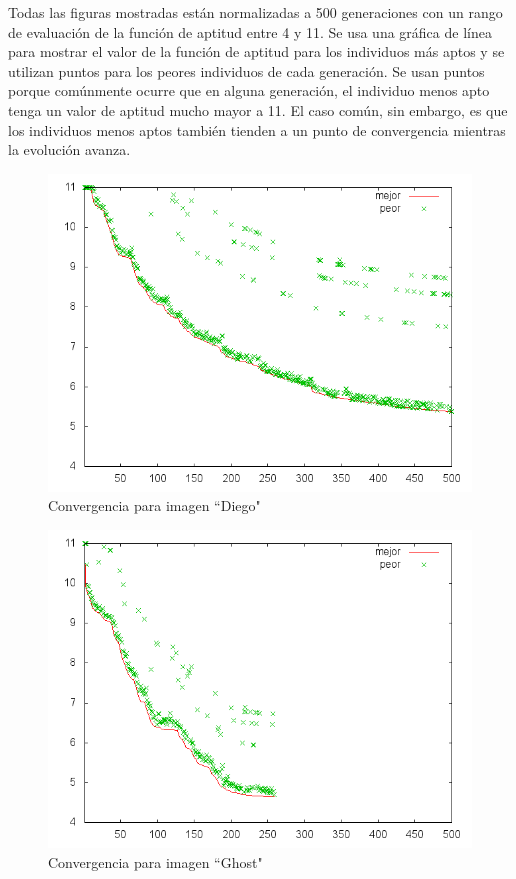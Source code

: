 Todas las figuras mostradas están normalizadas a 500 generaciones con un rango
de evaluación de la función de aptitud entre 4 y 11. Se usa una gráfica de
línea para mostrar el valor de la función de aptitud para los individuos más
aptos y se utilizan puntos para los peores individuos de cada generación. Se
usan puntos porque comúnmente ocurre que en alguna generación, el individuo
menos apto tenga un valor de aptitud mucho mayor a 11. El caso común, sin
embargo, es que los individuos menos aptos también tienden a un punto de
convergencia mientras la evolución avanza.

\begin{figure}[b]
    \includegraphics[width=1.0\textwidth]{plot_diego}
    \caption{Convergencia para imagen ``Diego"}
    \label{img:plot-diego}
\end{figure}

\begin{figure}[b]
    \includegraphics[width=1.0\textwidth]{plot_ghost}
    \caption{Convergencia para imagen ``Ghost"}
    \label{img:plot-ghost}
\end{figure}

